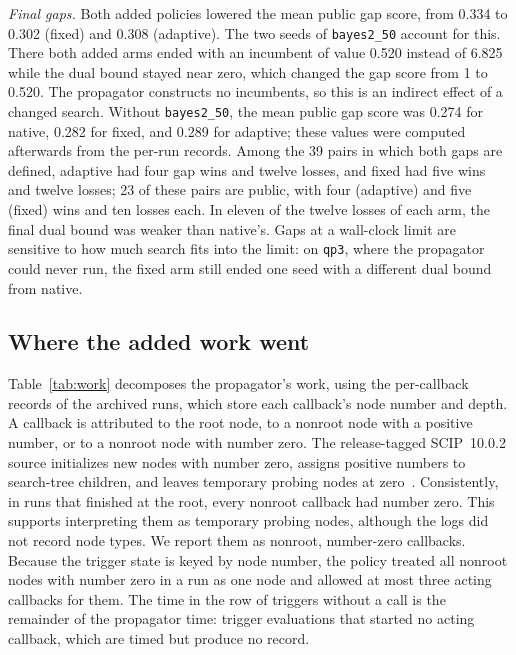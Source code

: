 \emph{Final gaps.} Both added policies lowered the mean public gap score, from
0.334 to 0.302 (fixed) and 0.308 (adaptive). The two seeds of
\texttt{bayes2\_50} account for this. There both added arms ended with an
incumbent of value 0.520 instead of 6.825 while the dual bound stayed near zero,
which changed the gap score from 1 to 0.520. The propagator constructs no
incumbents, so this is an indirect effect of a changed search. Without
\texttt{bayes2\_50}, the mean public gap score was 0.274 for native, 0.282 for
fixed, and 0.289 for adaptive; these values were computed afterwards from the
per-run records. Among the 39 pairs in which both gaps are defined, adaptive had four
gap wins and twelve losses, and fixed had five wins and twelve losses; 23 of
these pairs are public, with four (adaptive) and five (fixed) wins and ten losses
each. In eleven of the twelve losses of each arm, the final dual bound was weaker
than native's. Gaps at a wall-clock limit are sensitive to how much search fits
into the limit: on \texttt{qp3}, where the propagator could never run, the fixed
arm still ended one seed with a different dual bound from native.

\subsection{Where the added work went}\label{sec:experiments-work}

Table~\ref{tab:work} decomposes the propagator's work, using the per-callback
records of the archived runs, which store each callback's node number and
depth. A callback is attributed to the root node, to a nonroot node with a
positive number, or to a nonroot node with number zero. The release-tagged
SCIP~10.0.2 source initializes new nodes with number zero, assigns positive
numbers to search-tree children, and leaves temporary probing nodes at
zero~\cite{scip1002tree}. Consistently, in runs that finished at the root,
every nonroot callback had number zero. This supports interpreting them as
temporary probing nodes, although the logs did not record node types. We report
them as nonroot, number-zero callbacks.
Because the trigger state is keyed by node number,
the policy treated all nonroot nodes with number zero in a run as one node and allowed at most
three acting callbacks for them. The time in the row of triggers without a call is the
remainder of the propagator time: trigger evaluations that started no acting callback,
which are timed but produce no record.

